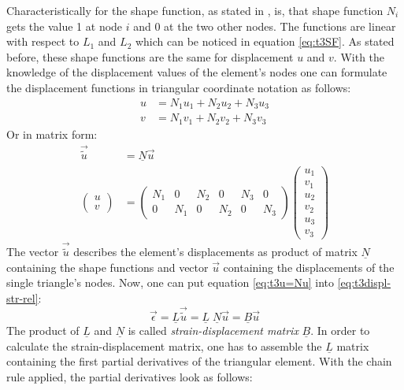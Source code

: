\documentclass[11pt,twoside]{scrartcl}
\begin{document}
  Characteristically for the shape function, as stated in \cite{steinke2005finite}, is, that shape function $N_i$ gets the value 1 at node $i$ and 0 at the two other nodes. The functions are linear with respect to $L_1$ and $L_2$ which can be noticed in equation \ref{eq:t3SF}. As stated before, these shape functions are the same for displacement $u$ and $v$. With the knowledge of the displacement values of the element's nodes one can formulate the displacement functions in triangular coordinate notation as follows:
  \begin{align}
  u &= N_1 u_1 + N_2 u_2 + N_3 u_3 \nonumber\\
  v &= N_1 v_1 + N_2 v_2 + N_3 v_3
  \end{align}
  Or in matrix form:
  \begin{align} \label{eq:t3u=Nu}
  \vec{\tilde{u}} &= \underline{N} \vec{u} \nonumber\\
  \begin{pmatrix}
  u \\ v
  \end{pmatrix} &= \begin{pmatrix}
  N_1 & 0 & N_2 & 0 & N_3 & 0 \\
  0 & N_1 & 0 & N_2 & 0 & N_3
  \end{pmatrix} \begin{pmatrix}
  u_1 \\ v_1 \\ u_2 \\ v_2 \\ u_3 \\ v_3
  \end{pmatrix}
  \end{align}
  The vector $\vec{\tilde{u}}$ describes the element's displacements as product of matrix $\underline{N}$ containing the shape functions and vector $\vec{u}$ containing the displacements of the single triangle's nodes. Now, one can put equation \ref{eq:t3u=Nu} into \ref{eq:t3displ-str-rel}:
  \begin{equation}
  \vec{\epsilon} = \underline{L}\vec{\tilde{u}} = \underline{L}\;\underline{N} \vec{u} = \underline{B} \vec{u}
  \end{equation}
  The product of $\underline{L}$ and $\underline{N}$ is called \textit{strain-displacement matrix} $\underline{B}$.
  In order to calculate the strain-displacement matrix, one has to assemble the $\underline{L}$ matrix containing the first partial derivatives of the triangular element. With the chain rule applied, the partial derivatives look as follows:
\end{document}
